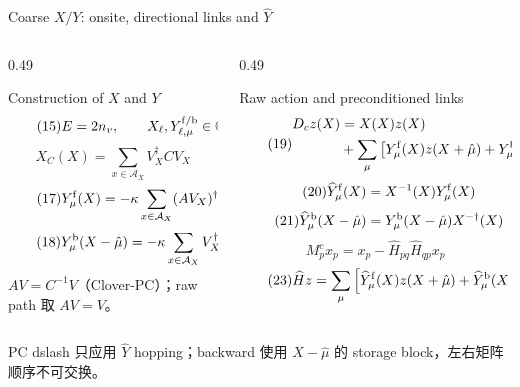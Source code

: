 \documentclass[UTF8,aspectratio=169,11pt,fontset=none]{ctexbeamer}
\begin{document}
\begin{frame}[t,shrink=6]{Coarse \(X/Y\): onsite, directional links and \(\widehat Y\)}
\begin{columns}[T,totalwidth=\textwidth]
\begin{column}{0.49\textwidth}
  \begin{block}{Construction of \(X\) and \(Y\)}
  \small
  \begin{equation}\tag{15}
  E=2n_v,\qquad X_\ell,Y^{\rm f/b}_{\ell,\mu}
  \in\mathbb C^{E\times E}
  \end{equation}
  \begin{equation}\tag{16}
  X_C(X)=\sum_{x\in\mathcal A_X}V_X^\dagger C V_X
  \end{equation}
  \begin{equation}\tag{17}
  Y^{\rm f}_{\mu}(X)=-\kappa\sum_{x\in\mathcal A_X}
  (AV_X)^\dagger U_\mu V_{X+\hat\mu}
  \end{equation}
  \begin{equation}\tag{18}
  Y^{\rm b}_{\mu}(X-\hat\mu)=-\kappa\sum_{x\in\mathcal A_X}
  V_X^\dagger U^\dagger_\mu AV_{X-\hat\mu}
  \end{equation}
  \(AV=C^{-1}V\)（Clover-PC）；raw path 取 \(AV=V\)。
  \end{block}
\end{column}
\begin{column}{0.49\textwidth}
  \begin{block}{Raw action and preconditioned links}
  \small
  \begin{equation}\tag{19}
  \begin{aligned}
  D_cz(X)&=X(X)z(X)\\
  &+\sum_\mu\left[Y_\mu^{\rm f}(X)z(X+\hat\mu)
  +Y_\mu^{\rm b}(X-\hat\mu)^\dagger z(X-\hat\mu)\right]
  \end{aligned}
  \end{equation}
  \begin{equation}\tag{20}
  \widehat Y^{\rm f}_{\mu}(X)=X^{-1}(X)Y^{\rm f}_{\mu}(X)
  \end{equation}
  \begin{equation}\tag{21}
  \widehat Y^{\rm b}_{\mu}(X-\hat\mu)
  =Y^{\rm b}_{\mu}(X-\hat\mu)X^{-\dagger}(X)
  \end{equation}
  \begin{equation}\tag{22}
  M_p^cx_p=x_p-\widehat H_{pq}\widehat H_{qp}x_p
  \end{equation}
  \begin{equation}\tag{23}
  \widehat Hz=\sum_\mu\left[
  \widehat Y_\mu^{\rm f}(X)z(X+\hat\mu)
  +\widehat Y_\mu^{\rm b}(X-\hat\mu)^\dagger z(X-\hat\mu)
  \right]
  \end{equation}
  \end{block}
\end{column}
\end{columns}
\vspace{-0.15cm}
\begin{minipage}{0.96\textwidth}
\small
PC dslash 只应用 \(\widehat Y\) hopping；backward 使用
\(X-\hat\mu\) 的 storage block，左右矩阵顺序不可交换。
\end{minipage}
\end{frame}
\end{document}
